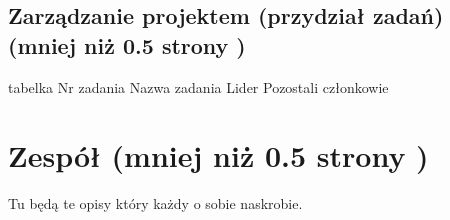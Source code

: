 			
\subsection{Zarządzanie projektem (przydział zadań) (mniej niż 0.5 strony )}
	tabelka
	Nr zadania	Nazwa zadania		Lider	Pozostali członkowie
	
	
\section{Zespół (mniej niż 0.5 strony )}
	Tu będą te opisy który każdy o sobie naskrobie.
	
	
	
	

